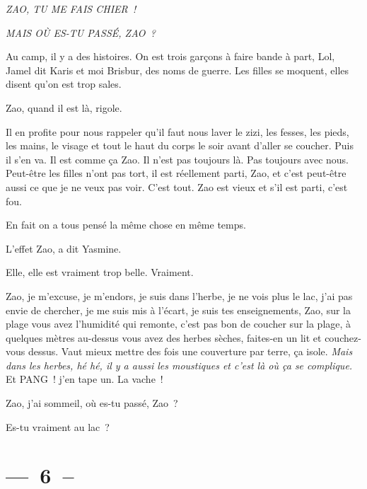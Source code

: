 \documentclass[french,twoside]{book} %
\begin{document}
\par
{\itshape ZAO, TU ME FAIS CHIER !}\par
{\itshape MAIS OÙ ES-TU PASSÉ, ZAO ?}\par
\bigbreak
\noindent Au camp, il y a des histoires. On est trois garçons à faire bande à part, Lol, Jamel dit Karis et moi Brisbur, des noms de guerre. Les filles se moquent, elles disent qu’on est trop sales.\par
Zao, quand il est là, rigole.\par
Il en profite pour nous rappeler qu’il faut nous laver le zizi, les fesses, les pieds, les mains, le visage et tout le haut du corps le soir avant d’aller se coucher. Puis il s’en va. Il est comme ça Zao. Il n’est pas toujours là. Pas toujours avec nous. Peut-être les filles n’ont pas tort, il est réellement parti, Zao, et c’est peut-être aussi ce que je ne veux pas voir. C’est tout. Zao est vieux et s’il est parti, c’est fou.\par
\bigbreak
\noindent En fait on a tous pensé la même chose en même temps.\par
L’effet Zao, a dit Yasmine.\par
Elle, elle est vraiment trop belle. Vraiment.\par
Zao, je m’excuse, je m’endors, je suis dans l’herbe, je ne vois plus le lac, j’ai pas envie de chercher, je me suis mis à l’écart, je suis tes enseignements, Zao, sur la plage vous avez l’humidité qui remonte, c’est pas bon de coucher sur la plage, à quelques mètres au-dessus vous avez des herbes sèches, faites-en un lit et couchez-vous dessus. Vaut mieux mettre des fois une couverture par terre, ça isole. \emph{Mais dans les herbes, hé hé, il y a aussi les moustiques et c’est là où ça se complique.} Et PANG ! j’en tape un. La vache !\par
\bigbreak
\noindent Zao, j’ai sommeil, où es-tu passé, Zao ?\par
Es-tu vraiment au lac ?
\section[{— 6 –}]{— 6 –}\renewcommand{\leftmark}{— 6 –}
\end{document}

